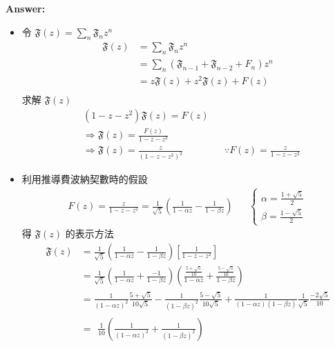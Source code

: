 \documentclass[11pt,fleqn]{article}
\renewcommand\part[1]{\vspace{.10in}\textbf{#1}}
\begin{document}
\part{Answer:}

\begin{itemize}
	\item 令 $\mathfrak{F}(z) = \sum_n \mathfrak{F}_n z^n$
		\begin{align*}
		\mathfrak{F}(z) &= \sum_n \mathfrak{F}_n z^n \\
			&= \sum_n (\mathfrak{F}_{n-1}+\mathfrak{F}_{n-2}+F_n) z^n \\
			&= z \mathfrak{F}(z) + z^2 \mathfrak{F}(z) + F(z) \\
		\end{align*}
		求解 $\mathfrak{F}(z)$
		\begin{align*}
		&(1 - z - z^2) \mathfrak{F}(z) = F(z) \\
		&\Rightarrow \mathfrak{F}(z) = \frac{F(z)}{1 - z - z^2} \\
		&\Rightarrow \mathfrak{F}(z) = \frac{z}{(1 - z - z^2)^2} 
			&& \because F(z) = \frac{z}{1-z-z^2}
		\end{align*}
	\item 利用推導費波納契數時的假設 
		\begin{align*}
			F(z)=\frac{z}{1-z-z^2} = \frac{1}{\sqrt{5}} \left(\frac{1}{1- \alpha z} - \frac{1}{1- \beta z}\right) && \left\{\begin{matrix}\alpha = \frac{1+\sqrt{5}}{2}\\ \beta = \frac{1-\sqrt{5}}{2}\end{matrix}\right.
		\end{align*}
		得 $\mathfrak{F}(z)$ 的表示方法
		\begin{align*}
			\mathfrak{F}(z) &= \frac{1}{\sqrt{5}} \left(\frac{1}{1- \alpha z} - \frac{1}{1- \beta z}\right) \left[ \frac{1}{1-z-z^2} \right] \\
				&= \frac{1}{\sqrt{5}} \left(\frac{1}{1- \alpha z} + \frac{-1}{1- \beta z}\right) 
					\left( \frac{\frac{5+\sqrt{5}}{10}}{1-\alpha z} + 
						\frac{\frac{5-\sqrt{5}}{10}}{1-\beta z} \right) \\
				&= \frac{1}{(1-\alpha z)^2} \frac{5 + \sqrt{5}}{10\sqrt{5}} 
					- \frac{1}{(1-\beta z)^2} \frac{5 - \sqrt{5}}{10\sqrt{5}} 
					+ \frac{1}{(1-\alpha z)(1-\beta z)} \frac{1}{\sqrt{5}} \frac{-2\sqrt{5}}{10}
					\\
				&= \begin{aligned}
					\frac{1}{10} \left( \frac{1}{(1-\alpha z)^2} + \frac{1}{(1-\beta z)^2}\right)

\end{aligned}
\end{align*}
\end{itemize}
\end{document}
